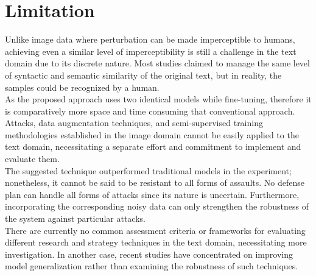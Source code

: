 \documentclass[%
	BCOR=8mm, %
	DIV=12,
	toc=bibliography, %
	toc=listof, %
	oneside, %
	egregdoesnotlikesansseriftitles, %
	]{scrbook}
\begin{document}
\section{Limitation}
\label{section:limitations}
Unlike image data where perturbation can be made imperceptible to humans, achieving even a similar level of imperceptibility is still a challenge in the text domain due to its discrete nature. Most studies claimed to manage the same level of syntactic and semantic similarity of the original text, but in reality, the samples could be recognized by a human.\\
As the proposed approach uses two identical models while fine-tuning, therefore it is comparatively more space and time consuming  that conventional approach. \\
Attacks, data augmentation techniques, and semi-supervised training methodologies established in the image domain cannot be easily applied to the text domain, necessitating a separate effort and commitment to implement and evaluate them.\\
The suggested technique outperformed traditional models in the experiment; nonetheless, it cannot be said to be resistant to all forms of assaults. No defense plan can handle all forms of attacks since its nature is uncertain. Furthermore, incorporating the corresponding noisy data can only strengthen the robustness of the system against particular attacks.\\
There are currently no common assessment criteria or frameworks for evaluating different research and strategy techniques in the text domain, necessitating more investigation. In another case, recent studies have concentrated on improving model generalization rather than examining the robustness of such techniques.
\end{document}
